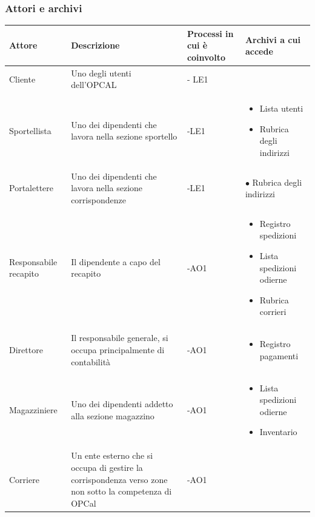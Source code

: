 \subsubsection{Attori e archivi}
\begin{table}[H]
  \centering
  \begin{tabular}{|>{\centering\arraybackslash}m{}|
                  >{\centering\arraybackslash}m{}|
                  >{\centering\arraybackslash}m{}|
                  >{\centering\arraybackslash}m{}|}
    \hline
    \textbf{Attore} & \textbf{Descrizione} & \textbf{Processi in cui è coinvolto} & \textbf{Archivi a cui accede} \\ 
    \hline
    Cliente & Uno degli utenti dell'OPCAL & - LE1 & \\ 
    \hline 
    Sportellista & Uno dei dipendenti che lavora nella sezione sportello & -LE1 & \begin{itemize} \item Lista utenti 
    \item Rubrica degli indirizzi \end{itemize} \\ 
      \hline 
      Portalettere & Uno dei dipendenti che lavora nella sezione corrispondenze & -LE1 & $\bullet$ Rubrica degli indirizzi \\ 
      \hline
      Responsabile recapito & Il dipendente a capo del recapito & -AO1 &
      \begin{itemize}
        \item{Registro spedizioni}
        \item{Lista spedizioni odierne}
        \item{Rubrica corrieri}
      \end{itemize} \\
      \hline
      Direttore & Il responsabile generale, si occupa principalmente di contabilità & -AO1 &
      \begin{itemize}
        \item{Registro pagamenti}
      \end{itemize} \\
      \hline
      Magazziniere & Uno dei dipendenti addetto alla sezione magazzino & -AO1 &
      \begin{itemize}
        \item{Lista spedizioni odierne}
        \item{Inventario}
      \end{itemize} \\
      \hline
      Corriere & Un ente esterno che si occupa di gestire la corrispondenza verso zone non sotto la competenza di OPCal & -AO1 & \\
      \hline
  \end{tabular}
\end{table}

